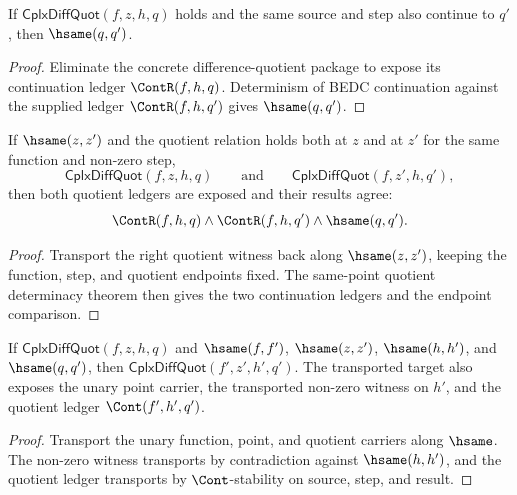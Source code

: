 \begin{lemma}
\label{lem:cplx-diff-quot-cont-result-hsame}
If $\mathsf{CplxDiffQuot}(f,z,h,q)$ holds and the same source and step also
continue to $q'$, then $\hsame(q,q')$.
\end{lemma}
\begin{proof}
Eliminate the concrete difference-quotient package to expose its continuation
ledger $\ContR(f,h,q)$. Determinism of BEDC continuation against the supplied
ledger $\ContR(f,h,q')$ gives $\hsame(q,q')$.
\end{proof}

\begin{lemma}
\label{lem:cplx-diff-quot-point-hsame-cont-deterministic}
If $\hsame(z,z')$ and the quotient relation holds both at $z$ and at $z'$ for
the same function and non-zero step,
$$
\mathsf{CplxDiffQuot}(f,z,h,q)
\qquad\text{and}\qquad
\mathsf{CplxDiffQuot}(f,z',h,q'),
$$
then both quotient ledgers are exposed and their results agree:
$$
\ContR(f,h,q)\land \ContR(f,h,q')\land \hsame(q,q').
$$
\end{lemma}
\begin{proof}
Transport the right quotient witness back along $\hsame(z,z')$, keeping the
function, step, and quotient endpoints fixed. The same-point quotient
determinacy theorem then gives the two continuation ledgers and the endpoint
comparison.
\end{proof}

\begin{lemma}
\label{lem:cplx-diff-quot-hsame}
If \(\mathsf{CplxDiffQuot}(f, z, h, q)\) and \(\hsame(f,f')\), \(\hsame(z,z')\), \(\hsame(h,h')\), and \(\hsame(q,q')\), then \(\mathsf{CplxDiffQuot}(f', z', h', q')\). The transported target also exposes the unary point carrier, the transported non-zero witness on \(h'\), and the quotient ledger \(\Cont(f',h',q')\).
\end{lemma}
\begin{proof}
Transport the unary function, point, and quotient carriers along \(\hsame\). The non-zero witness transports by contradiction against \(\hsame(h,h')\), and the quotient ledger transports by \(\Cont\)-stability on source, step, and result.
\end{proof}

